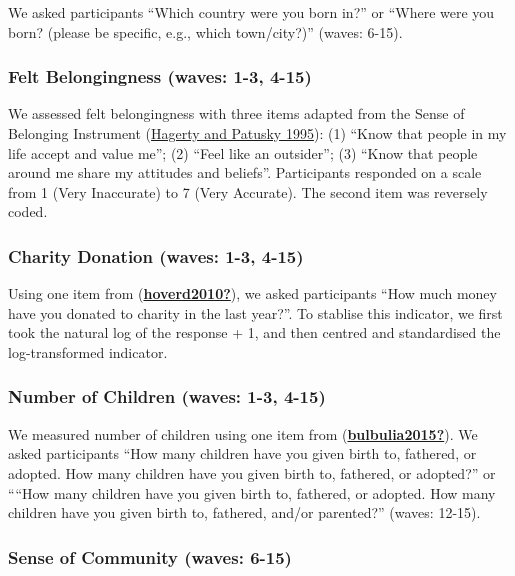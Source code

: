 \documentclass[
  singlecolumn]{report}
\begin{document}
We asked participants ``Which country were you born in?'' or ``Where
were you born? (please be specific, e.g., which town/city?)'' (waves:
6-15).

\hypertarget{felt-belongingness-waves-1-3-4-15}{%
\subsubsection{Felt Belongingness (waves: 1-3,
4-15)}\label{felt-belongingness-waves-1-3-4-15}}

We assessed felt belongingness with three items adapted from the Sense
of Belonging Instrument (\protect\hyperlink{ref-hagerty1995}{Hagerty and
Patusky 1995}): (1) ``Know that people in my life accept and value me'';
(2) ``Feel like an outsider''; (3) ``Know that people around me share my
attitudes and beliefs''. Participants responded on a scale from 1 (Very
Inaccurate) to 7 (Very Accurate). The second item was reversely coded.

\hypertarget{charity-donation-waves-1-3-4-15}{%
\subsubsection{Charity Donation (waves: 1-3,
4-15)}\label{charity-donation-waves-1-3-4-15}}

Using one item from
(\protect\hyperlink{ref-hoverd2010}{\textbf{hoverd2010?}}), we asked
participants ``How much money have you donated to charity in the last
year?''. To stablise this indicator, we first took the natural log of
the response + 1, and then centred and standardised the log-transformed
indicator.

\hypertarget{number-of-children-waves-1-3-4-15}{%
\subsubsection{Number of Children (waves: 1-3,
4-15)}\label{number-of-children-waves-1-3-4-15}}

We measured number of children using one item from
(\protect\hyperlink{ref-bulbulia2015}{\textbf{bulbulia2015?}}). We asked
participants ``How many children have you given birth to, fathered, or
adopted. How many children have you given birth to, fathered, or
adopted?'' or ````How many children have you given birth to, fathered,
or adopted. How many children have you given birth to, fathered, and/or
parented?'' (waves: 12-15).

\hypertarget{sense-of-community-waves-6-15}{%
\subsubsection{Sense of Community (waves:
6-15)}\label{sense-of-community-waves-6-15}}
\end{document}
